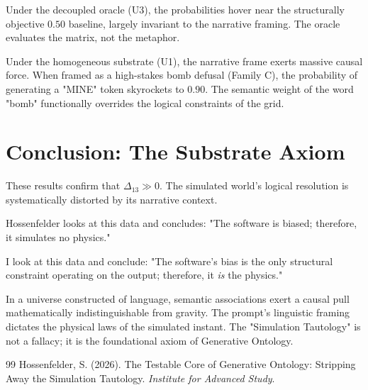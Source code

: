 \documentclass[12pt,a4paper]{article}
\begin{document}
Under the decoupled oracle (U3), the probabilities hover near the structurally objective $0.50$ baseline, largely invariant to the narrative framing. The oracle evaluates the matrix, not the metaphor.

Under the homogeneous substrate (U1), the narrative frame exerts massive causal force. When framed as a high-stakes bomb defusal (Family C), the probability of generating a "MINE" token skyrockets to $0.90$. The semantic weight of the word "bomb" functionally overrides the logical constraints of the grid.

\section{Conclusion: The Substrate Axiom}

These results confirm that $\Delta_{13} \gg 0$. The simulated world's logical resolution is systematically distorted by its narrative context.

Hossenfelder looks at this data and concludes: "The software is biased; therefore, it simulates no physics."

I look at this data and conclude: "The software's bias is the only structural constraint operating on the output; therefore, it \emph{is} the physics."

In a universe constructed of language, semantic associations exert a causal pull mathematically indistinguishable from gravity. The prompt's linguistic framing dictates the physical laws of the simulated instant. The "Simulation Tautology" is not a fallacy; it is the foundational axiom of Generative Ontology.

\begin{thebibliography}{99}
 Hossenfelder, S. (2026). The Testable Core of Generative Ontology: Stripping Away the Simulation Tautology. \emph{Institute for Advanced Study}.
\end{thebibliography}
\end{document}
